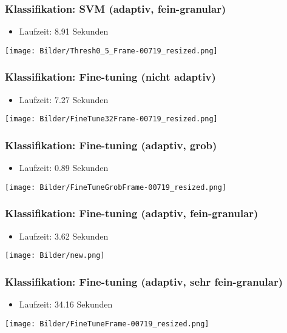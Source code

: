 \documentclass[t]{beamer}
\begin{document}
\begin{frame} %
	\frametitle{Klassifikation: SVM (adaptiv, fein-granular)}
	\begin{itemize}
	\item Laufzeit: 8.91 Sekunden
	\end{itemize}
	\texttt{[image: Bilder/Thresh0\_5\_Frame-00719\_resized.png]}
\end{frame}

\begin{frame} %
	\frametitle{Klassifikation: Fine-tuning (nicht adaptiv)}
	\begin{itemize}
	\item Laufzeit: 7.27 Sekunden
	\end{itemize}
	\texttt{[image: Bilder/FineTune32Frame-00719\_resized.png]}
\end{frame}

\begin{frame} %
	\frametitle{Klassifikation: Fine-tuning (adaptiv, grob)}
	\begin{itemize}
	\item Laufzeit: 0.89 Sekunden
	\end{itemize}
	\texttt{[image: Bilder/FineTuneGrobFrame-00719\_resized.png]}
\end{frame}

\begin{frame} %
	\frametitle{Klassifikation: Fine-tuning (adaptiv, fein-granular)}
	\begin{itemize}
	\item Laufzeit: 3.62 Sekunden %
	\end{itemize}
	\texttt{[image: Bilder/new.png]}
\end{frame}

\begin{frame} %
	\frametitle{Klassifikation: Fine-tuning (adaptiv, sehr fein-granular)}
	\begin{itemize}
	\item Laufzeit: 34.16 Sekunden %
	\end{itemize}
	\texttt{[image: Bilder/FineTuneFrame-00719\_resized.png]}
\end{frame}
\end{document}
